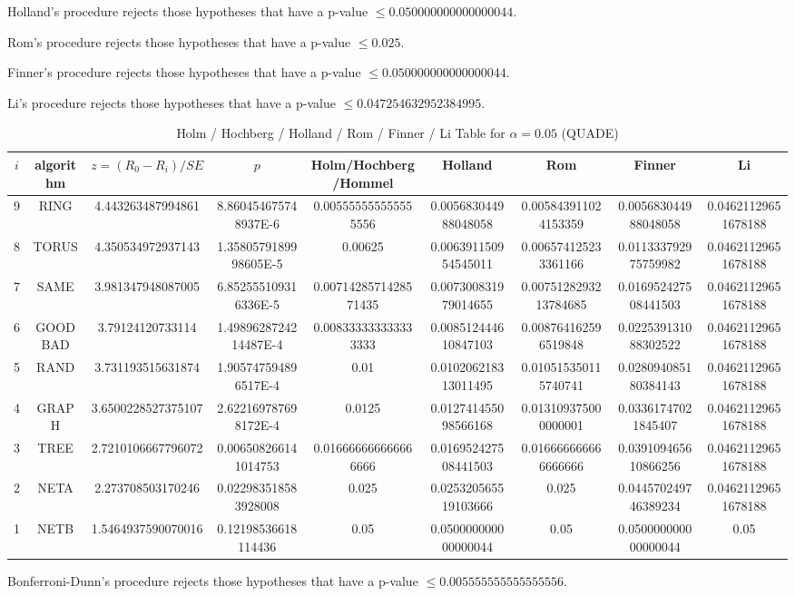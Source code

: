\documentclass[a4paper,10pt]{article}
\begin{document}
\begin{landscape}
Holland's procedure rejects those hypotheses that have a p-value $\le0.050000000000000044$.


Rom's procedure rejects those hypotheses that have a p-value $\le0.025$.


Finner's procedure rejects those hypotheses that have a p-value $\le0.050000000000000044$.


Li's procedure rejects those hypotheses that have a p-value $\le0.047254632952384995$.



\newpage

\begin{table}[!htp]
\centering\scriptsize
\caption{Holm / Hochberg / Holland / Rom / Finner / Li Table for $\alpha=0.05$ (QUADE)}
\begin{tabular}{ccccccccc}
$i$&algorithm&$z=(R_0 - R_i)/SE$&$p$&Holm/Hochberg/Hommel&Holland&Rom&Finner&Li\\
\hline
9& RING&4.443263487994861&8.860454675748937E-6&0.005555555555555556&0.005683044988048058&0.005843911024153359&0.005683044988048058&0.04621129651678188\\
8& TORUS&4.350534972937143&1.3580579189998605E-5&0.00625&0.006391150954545011&0.006574125233361166&0.011333792975759982&0.04621129651678188\\
7& SAME&3.981347948087005&6.852555109316336E-5&0.0071428571428571435&0.007300831979014655&0.0075128293213784685&0.016952427508441503&0.04621129651678188\\
6& GOODBAD&3.79124120733114&1.4989628724214487E-4&0.008333333333333333&0.008512444610847103&0.008764162596519848&0.022539131088302522&0.04621129651678188\\
5& RAND&3.731193515631874&1.905747594896517E-4&0.01&0.010206218313011495&0.010515350115740741&0.028094085180384143&0.04621129651678188\\
4& GRAPH&3.6500228527375107&2.622169787698172E-4&0.0125&0.012741455098566168&0.013109375000000001&0.03361747021845407&0.04621129651678188\\
3& TREE&2.7210106667796072&0.006508266141014753&0.016666666666666666&0.016952427508441503&0.016666666666666666&0.039109465610866256&0.04621129651678188\\
2& NETA&2.273708503170246&0.022983518583928008&0.025&0.025320565519103666&0.025&0.044570249746389234&0.04621129651678188\\
1& NETB&1.5464937590070016&0.12198536618114436&0.05&0.050000000000000044&0.05&0.050000000000000044&0.05\\
\hline
\end{tabular}
\end{table}
Bonferroni-Dunn's procedure rejects those hypotheses that have a p-value $\le0.005555555555555556$.



\end{landscape}
\end{document}
